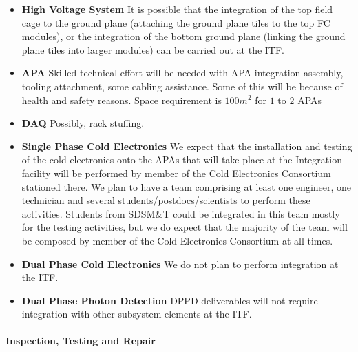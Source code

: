 \begin{itemize}
  \item {\bf High Voltage System} It is possible that the integration of the top field cage to the 
ground plane (attaching the ground plane tiles to the top FC modules), or the integration of the 
bottom ground plane (linking the ground plane tiles into larger modules) can be carried out at the 
ITF.
  \item {\bf APA} Skilled technical effort will be needed with APA integration assembly, tooling 
attachment, some cabling assistance. Some of this will be because of health and safety reasons. Space requirement is $100 m^2$ for $1$ to $2$ APAs
  \item {\bf DAQ} Possibly, rack stuffing.
  \item {\bf Single Phase Cold Electronics} We expect that the installation and testing of 
the cold electronics onto the APAs that will take place at the Integration facility will be performed by 
member of the Cold Electronics Consortium stationed there. We plan to have a team comprising at 
least one engineer, one technician and several students/postdocs/scientists to perform these 
activities. Students from SDSM\&T could be integrated in this team mostly for the testing activities, 
but we do expect that the majority of the team will be composed by member of the Cold Electronics 
Consortium at all times.
   \item {\bf Dual Phase Cold Electronics} We do not plan to perform integration at the ITF.
   \item {\bf Dual Phase Photon Detection} DPPD deliverables will not require integration with 
other subsystem elements at the ITF.
\end{itemize}

\paragraph{\bf Inspection, Testing and Repair}

